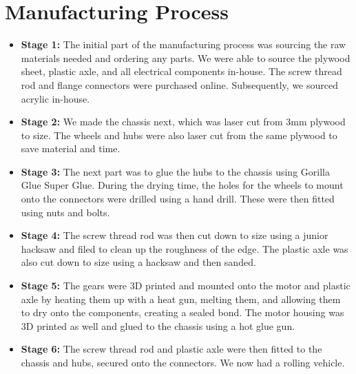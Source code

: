 \documentclass{article}
\begin{document}
\newpage
{}
{}



\restoregeometry{}

\section{Manufacturing Process}

\begin{itemize}
	\item \textbf{Stage 1:} The initial part of the manufacturing process was sourcing the raw materials needed and ordering any parts. We were able to source the plywood sheet, plastic axle, and all electrical components in-house. The screw thread rod and flange connectors were purchased online. Subsequently, we sourced acrylic in-house.
	
	\item \textbf{Stage 2:} We made the chassis next, which was laser cut from 3mm plywood to size. The wheels and hubs were also laser cut from the same plywood to save material and time.
	
	\item \textbf{Stage 3:} The next part was to glue the hubs to the chassis using Gorilla Glue Super Glue. During the drying time, the holes for the wheels to mount onto the connectors were drilled using a hand drill. These were then fitted using nuts and bolts.
	
	\item \textbf{Stage 4:} The screw thread rod was then cut down to size using a junior hacksaw and filed to clean up the roughness of the edge. The plastic axle was also cut down to size using a hacksaw and then sanded.
	
	\item \textbf{Stage 5:} The gears were 3D printed and mounted onto the motor and plastic axle by heating them up with a heat gun, melting them, and allowing them to dry onto the components, creating a sealed bond. The motor housing was 3D printed as well and glued to the chassis using a hot glue gun.
	
	\item \textbf{Stage 6:} The screw thread rod and plastic axle were then fitted to the chassis and hubs, secured onto the connectors. We now had a rolling vehicle.
	

\end{itemize}
\end{document}

